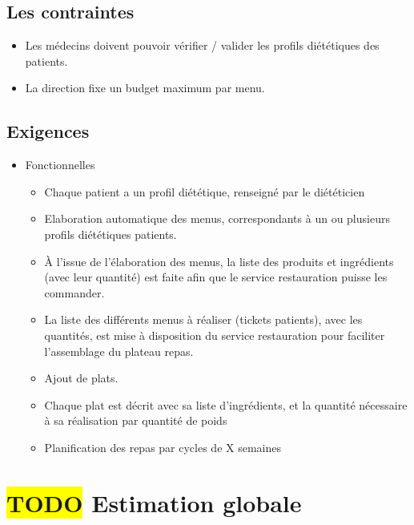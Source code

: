 \subsection{Les contraintes}
\begin{itemize}
\item Les médecins doivent pouvoir vérifier / valider les profils diététiques des patients.
\item La direction fixe un budget maximum par menu.
\end{itemize}

\subsection{Exigences}
\begin{itemize}
\item Fonctionnelles
  \begin{itemize}
  \item Chaque patient a un profil diététique, renseigné par le diététicien
  \item Elaboration automatique des menus, correspondants à un ou plusieurs profils diététiques patients.
  \item À l'issue de l'élaboration des menus, la liste des produits et
    ingrédients (avec leur quantité) est faite afin que le service
    restauration puisse les commander.
  \item La liste des différents menus à réaliser (tickets patients), avec les quantités, est mise à disposition du service restauration pour faciliter l'assemblage du plateau repas.
  \item Ajout de plats.
  \item Chaque plat est décrit avec sa liste d'ingrédients, et la quantité nécessaire à sa réalisation par quantité de poids
  \item Planification des repas par cycles de X semaines
  \end{itemize}
\end{itemize}



\section{\colorbox{yellow}{TODO} Estimation globale}
